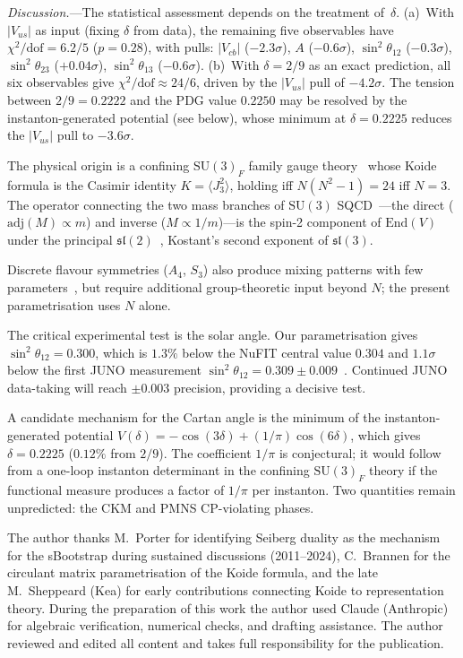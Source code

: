 \documentclass[aps,prl,twocolumn,showpacs,preprintnumbers,superscriptaddress]{revtex4-2}
\newcommand{\SU}{\mathrm{SU}}
\newcommand{\adj}{\mathrm{adj}}
\begin{document}
\textit{Discussion.}---The statistical assessment depends on
the treatment of~$\delta$.
(a)~With $|V_{us}|$ as input (fixing $\delta$ from data),
the remaining five observables have
$\chi^2/\text{dof} = 6.2/5$ ($p = 0.28$), with pulls:
$|V_{cb}|$ ($-2.3\sigma$), $A$ ($-0.6\sigma$),
$\sin^2\theta_{12}$ ($-0.3\sigma$),
$\sin^2\theta_{23}$ ($+0.04\sigma$),
$\sin^2\theta_{13}$ ($-0.6\sigma$).
(b)~With $\delta = 2/9$ as an exact prediction, all six
observables give $\chi^2/\text{dof} \approx 24/6$,
driven by the $|V_{us}|$ pull of $-4.2\sigma$.
The tension between $2/9 = 0.2222$ and the PDG value
$0.2250$ may be resolved by the instanton-generated
potential (see below), whose minimum at $\delta = 0.2225$
reduces the $|V_{us}|$ pull to $-3.6\sigma$.

The physical origin is a confining $\SU(3)_F$ family gauge
theory~\cite{Rivero:2024} whose Koide formula is the
Casimir identity $K = \langle J_3^2\rangle$, holding iff
$N(N^2{-}1) = 24$ iff $N = 3$.
The operator connecting the two mass branches of $\SU(3)$
SQCD~\cite{Seiberg:1995}---the direct ($\adj(M) \propto m$)
and inverse ($M \propto 1/m$)---is the spin-2 component of
$\mathrm{End}(V)$ under the principal
$\mathfrak{sl}(2)$~\cite{Kostant:1959},
Kostant's second exponent of $\mathfrak{sl}(3)$.

Discrete flavour symmetries ($A_4$, $S_3$) also produce
mixing patterns with few parameters~\cite{Altarelli:2010,King:2015},
but require additional group-theoretic input beyond $N$;
the present parametrisation uses $N$ alone.

The critical experimental test is the solar angle.
Our parametrisation gives $\sin^2\theta_{12} = 0.300$, which is
$1.3\%$ below the NuFIT central value $0.304$ and $1.1\sigma$
below the first JUNO measurement
$\sin^2\theta_{12} = 0.309 \pm 0.009$~\cite{JUNO:2025}.
Continued JUNO data-taking will reach
$\pm 0.003$ precision, providing a decisive test.

A candidate mechanism for the Cartan angle is the minimum of
the instanton-generated potential
$V(\delta) = -\cos(3\delta) + (1/\pi)\cos(6\delta)$,
which gives $\delta = 0.2225$ ($0.12\%$ from $2/9$).
The coefficient $1/\pi$ is conjectural; it would follow from
a one-loop instanton determinant in the confining
$\SU(3)_F$ theory if the functional measure produces a
factor of $1/\pi$ per instanton.
Two quantities remain unpredicted: the CKM and PMNS
CP-violating phases.

\begin{acknowledgments}
The author thanks M.~Porter for identifying Seiberg duality
as the mechanism for the sBootstrap during sustained
discussions (2011--2024),
C.~Brannen for the circulant matrix parametrisation
of the Koide formula, and the late M.~Sheppeard (Kea) for
early contributions connecting Koide to representation theory.
During the preparation of this work the author used Claude
(Anthropic) for algebraic verification, numerical checks,
and drafting assistance.
The author reviewed and edited all content and takes full
responsibility for the publication.
\end{acknowledgments}
\end{document}
